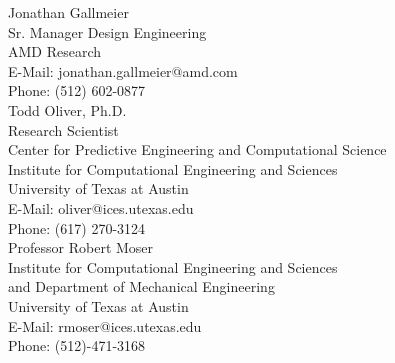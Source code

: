 


\noindent Jonathan Gallmeier \\
Sr. Manager Design Engineering \\
AMD Research \\
E-Mail: jonathan.gallmeier@amd.com \\
Phone: (512) 602-0877 \\
\newline
\newline
\noindent Todd Oliver, Ph.D. \\
Research Scientist \\
Center for Predictive Engineering and Computational Science \\
Institute for Computational Engineering and Sciences \\
University of Texas at Austin \\
E-Mail: oliver@ices.utexas.edu \\
Phone: (617) 270-3124 \\
\newline
\newline
\noindent Professor Robert Moser \\
Institute for Computational Engineering and Sciences \\
and Department of Mechanical Engineering \\
University of Texas at Austin \\
E-Mail: rmoser@ices.utexas.edu \\
\noindent Phone: (512)-471-3168 
